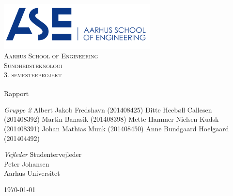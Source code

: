 \begin{titlingpage}
\begin{center}

~ \\[3cm]

\includegraphics[width=0.6\textwidth]{figurer/ASE}~\\[1cm]

\textsc{\LARGE Aarhus School of Engineering}\\[1.5cm]

\textsc{\Large Sundhedsteknologi}\\
\textsc{\Large 3. semesterprojekt}\\[0.5cm]

\noindent\makebox[\linewidth]{\rule{\textwidth}{0.4pt}}\\
[0.5cm]{\Huge Rapport}
\noindent\makebox[\linewidth]{\rule{\textwidth}{0.4pt}}

\end{center}

\textit{Gruppe 2} \newline
Albert Jakob Fredshavn (201408425) \newline
Ditte Heebøll Callesen (201408392) \newline
Martin Banasik  (201408398) \newline
Mette Hammer Nielsen-Kudsk  (201408391) \newline		 
Johan Mathias Munk  (201408450) \newline 
Anne Bundgaard Hoelgaard  (201404492) \newline



\textit{Vejleder} \newline
Studentervejleder\\
Peter Johansen\\
Aarhus Universitet


\vfill

\begin{center}
{\large \today}
\end{center}


\end{titlingpage}